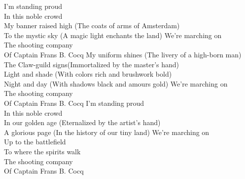 I'm standing proud\tab{}\tab{}\\
In this noble crowd\tab{}\tab{}\\
My banner raised high (The coats of arms of Amsterdam)\\
To the mystic sky (A magic light enchants the land)
\hops
{} We're marching on \tab{}\\
 The shooting company \tab{}\\
 Of Captain Frans B. Cocq 
\hops
My uniform shines (The livery of a high-born man)\\
The Claw-guild signs(Immortalized by the master's hand)\\
Light and shade (With colors rich and brushwork bold)\\
Night and day (With shadows black and amours gold)
\hops
{} We're marching on\\
 The shooting company \\
 Of Captain Frans B. Cocq
\hops
I'm standing proud\\
In this noble crowd\\
In our golden age (Eternalized by the artist's hand)\\
A glorious page (In the history of our tiny land)
\hops
{} We're marching on\tab{}\\
 Up to the battlefield \tab{}\\
 To where the spirits walk\tab{}\\
 The shooting company\tab{}\\
 Of Captain Frans B. Cocq\tab{}

\clearpage
{}

